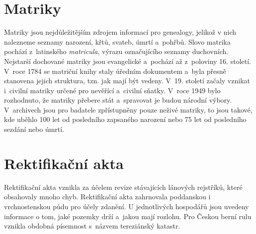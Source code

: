 \section{Matriky}
Matriky \cite{SestavteSiRodokmen, digitalizacevArchivech} jsou nejdůležitějším zdrojem informací pro genealogy, jelikož v nich nalezneme seznamy narození, křtů, svateb, úmrtí a~pohřbů. Slovo matrika pochází z~latinského \textit{matricula}, výrazu označujícího seznamy duchovních. Nejstarší dochované matriky jsou evangelické a~pochází až z~poloviny 16. století. V~roce 1784 se matriční knihy staly úředním dokumentem a~byla přesně stanovena jejich struktura, tzn. jak mají být vedeny. V~19. století začaly vznikat i~civilní matriky určené pro nevěřící a~civilní sňatky. V~roce 1949 bylo rozhodnuto, že matriky přebere stát a~spravovat je budou národní výbory. V~archivech jsou pro badatele zpřístupněny pouze neživé matriky, to jsou takové, kde uběhlo 100 let od posledního zapsaného narození nebo 75 let od posledního sezdání nebo úmrtí.

\section{Rektifikační akta}
Rektifikační akta \cite{SestavteSiRodokmen, rektifikacniAkta} vznikla za účelem revize stávajících lánových rejstříků, které obsahovaly mnoho chyb. Rektifikační akta zahrnovala poddanskou i vrchnostenskou půdu pro účely zdanění. U jednotlivých hospodářů jsou uvedeny informace o tom, jaké pozemky drží a~jakou mají rozlohu. Pro Českou berní rulu vznikla obdobná písemnost s~názvem tereziánský katastr.

